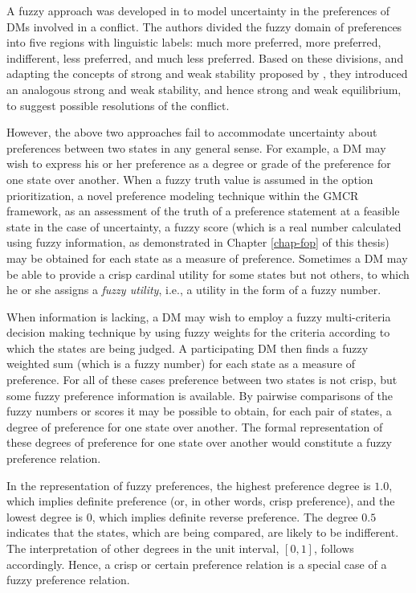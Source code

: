 A fuzzy approach was developed in \citep{Al-Mutairi-et-al2008} to model uncertainty in the preferences of DMs involved in a conflict. The authors divided the fuzzy domain of preferences into five regions with linguistic labels: much more preferred, more preferred, indifferent, less preferred, and much less preferred. Based on these divisions, and adapting the concepts of strong and weak stability proposed by \citet{Hamouda-et-al2004, Hamouda-et-al2006}, they introduced an analogous strong and weak stability, and hence strong and weak equilibrium, to suggest possible resolutions of the conflict.

However, the above two approaches fail to accommodate uncertainty about preferences between two states in any general sense. For example, a DM may wish to express his or her preference as a degree or grade of the preference for one state over another. When a fuzzy truth value is assumed in the option prioritization, a novel preference modeling technique within the GMCR framework, as an assessment of the truth of a preference statement at a feasible state in the case of uncertainty, a fuzzy score (which is a real number calculated using fuzzy information, as demonstrated in Chapter \ref{chap-fop} of this thesis) may be obtained for each state as a measure of preference. Sometimes a DM may be able to provide a crisp cardinal utility for some states but not others, to which he or she assigns a \emph{fuzzy utility}, i.e., a utility in the form of a fuzzy number.

When information is lacking, a DM may wish to employ a fuzzy multi-criteria decision making technique by using fuzzy weights for the criteria according to which the states are being judged. A participating DM then finds a fuzzy weighted sum (which is a fuzzy number) for each state as a measure of preference. For all of these cases preference between two states is not crisp, but some fuzzy preference information is available. By pairwise comparisons of the fuzzy numbers or scores it may be possible to obtain, for each pair of states, a degree of preference for one state over another. The formal representation of these degrees of preference for one state over another would constitute a fuzzy preference relation.

In the representation of fuzzy preferences, the highest preference degree is $1.0$, which implies definite preference (or, in other words, crisp preference), and the lowest degree is $0$, which implies definite reverse preference. The degree $0.5$ indicates that the states, which are being compared, are likely to be indifferent. The interpretation of other degrees in the unit interval, $[0, 1]$, follows accordingly. Hence, a crisp or certain preference relation is a special case of a fuzzy preference relation.

